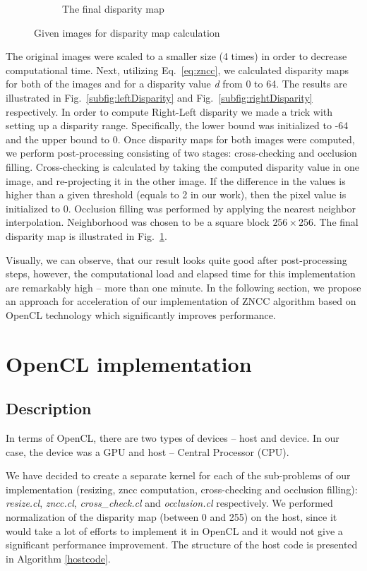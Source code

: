 \documentclass[conference]{IEEEtran}
\begin{document}
\begin{figure}[t!]
\begin{subfigure}{\linewidth}
 		\caption{The final disparity map}\label{subfig:finalDisparity}
	\end{subfigure}
\caption{Given images for disparity map calculation}\label{fig:disparities}
\end{figure}

The original images were scaled to a smaller size (4 times) in order to decrease computational time. Next, utilizing Eq.~\ref{eq:zncc}, we calculated disparity maps for both of the images and for a disparity value \textit{d} from 0 to 64. The results are illustrated in Fig.~\ref{subfig:leftDisparity} and Fig.~\ref{subfig:rightDisparity} respectively. In order to compute Right-Left disparity we made a trick with setting up a disparity range. Specifically, the lower bound was initialized to -64 and the upper bound to 0. Once disparity maps for both images were computed, we perform post-processing consisting of two stages: cross-checking and occlusion filling. Cross-checking is calculated by taking the computed disparity value in one image, and re-projecting it in the other image. If the difference in the values is higher than a given threshold (equals to 2 in our work), then the pixel value is initialized to 0. Occlusion filling was performed by applying the nearest neighbor interpolation. Neighborhood was chosen to be a square block $256\times256$. The final disparity map is illustrated in Fig.~\ref{subfig:finalDisparity}. 

Visually, we can observe, that our result looks quite good after post-processing steps, however, the computational load and elapsed time for this implementation are remarkably high -- more than one minute. In the following section, we propose an approach for acceleration of our implementation of ZNCC algorithm based on OpenCL technology which significantly improves performance.

\section{OpenCL implementation}\label{sec:OpenclImplementation}
\subsection{Description}
In terms of OpenCL, there are two types of devices -- host and device. In our case, the device was a GPU and host -- Central Processor (CPU).

We have decided to create a separate kernel for each of the sub-problems of our implementation (resizing, zncc computation, cross-checking and occlusion filling): \textit{resize.cl}, \textit{zncc.cl}, \textit{cross\_check.cl} and \textit{occlusion.cl} respectively. We performed normalization of the disparity map (between 0 and 255) on the host, since it would take a lot of efforts to implement it in OpenCL and it would not give a significant performance improvement. The structure of the host code is presented in Algorithm \ref{hostcode}.
\end{document}
